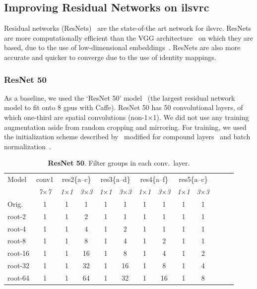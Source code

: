 \documentclass[thesis]{subfiles}
\begin{document}
	\subsection{Improving Residual Networks on \gls{ilsvrc}}
	Residual networks (ResNets)~\citep{He2015} are the state-of-the art network for \gls{ilsvrc}\@. ResNets are more computationally efficient than the VGG architecture~\citep{Simonyan2014verydeep} on which they are based, due to the use of low-dimensional embeddings~\citep{Lin2013NiN}. ResNets are also more accurate and quicker to converge due to the use of identity mappings.
	
	\subsubsection{ResNet 50}
	\label{resnet50results}
	As a baseline, we used the `ResNet 50' model~\citep{He2015} (the largest residual network model to fit onto 8 \gls{gpu}s with Caffe). ResNet 50 has 50 convolutional layers, of which one-third are spatial convolutions (non-1$\times$1). We did not use any training augmentation aside from random cropping and mirroring. 
	For training, we used the initialization scheme described by~\citep{He2015b} modified for compound layers~\citep{Ioannou2016} and batch normalization~\citep{Ioffe2015}.
	\begin{table}[tp]
		\caption[ResNet 50 root architectures]{\textbf{ResNet 50}. Filter groups in each conv.\ layer.}
		\label{table:resnet50config}
		\centering
		\begin{tabular}{@{}lcccccccccccc@{}}
			\toprule
			Model & conv1 & \multicolumn{2}{c}{res2\{a--c\}} & \multicolumn{2}{c}{res3\{a--d\}} & \multicolumn{2}{c}{res4\{a--f\}} & \multicolumn{2}{c}{res5\{a--c\}} \\
			& \textit{\footnotesize7$\times$7} & \textit{\footnotesize1$\times$1} & \textit{\footnotesize3$\times$3} & \textit{\footnotesize1$\times$1} & \textit{\footnotesize3$\times$3} & \textit{\footnotesize1$\times$1} & \textit{\footnotesize3$\times$3} & \textit{\footnotesize1$\times$1} & \textit{\footnotesize3$\times$3} \\
			Orig. & 1 & 1 & 1 & 1 &  1 & 1 &  1 & 1 & 1 \\
			\midrule
			root-2 & 1 & 1 & 2 & 1 &  1 & 1 &  1 & 1 & 1 \\
			root-4 & 1 & 1 & 4 & 1 &  2 & 1 &  1 & 1 & 1 \\
			root-8 & 1 & 1 & 8 & 1 &  4 & 1 &  2 & 1 & 1 \\
			root-16 & 1 & 1 & 16 & 1 &  8 & 1 &  4 & 1 & 2 \\
			root-32 & 1 & 1 & 32 & 1 & 16 & 1 &  8 & 1 & 4 \\
			root-64 & 1 & 1 & 64 & 1 & 32 & 1 & 16 & 1 & 8 \\
			\bottomrule
		\end{tabular}
	\end{table}
\end{document}
